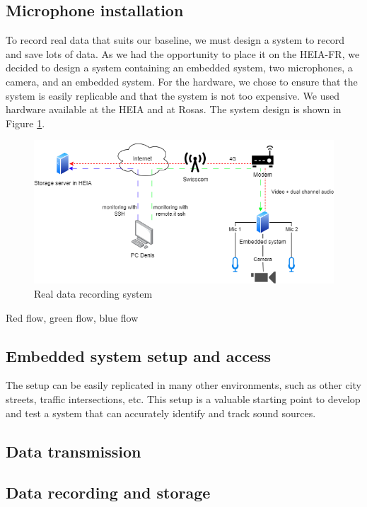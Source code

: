 \subsection{Microphone installation}

To record real data that suits our baseline, we must design a system to record and save lots of data. As we had the opportunity to place it on the HEIA-FR, we decided to design a system containing an embedded system, two microphones, a camera, and an embedded system. For the hardware, we chose to ensure that the system is easily replicable and that the system is not too expensive. We used hardware available at the HEIA and at Rosas. The system design is shown in Figure \ref{fig:real_data_recording_system}.

\begin{figure}[H]
    \centering
    \includegraphics[width=1\textwidth]{../Images/real_data_recording_system.drawio.png}
    \caption{Real data recording system}
    \label{fig:real_data_recording_system}
\end{figure}

Red flow, green flow, blue flow

\subsection{Embedded system setup and access}

The setup can be easily replicated in many other environments, such as other city streets, traffic intersections, etc. This setup is a valuable starting point to develop and test a system that can accurately identify and track sound sources.

\subsection{Data transmission}

\subsection{Data recording and storage}

